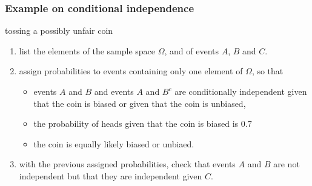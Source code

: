 \begin{frame}
    \frametitle{Example on conditional independence}

    \scriptsize
    \begin{manualProbExample}{tossing a possibly unfair coin}

        \begin{enumerate}[a]

            \item list the elements of the sample space $\Omega$, and of events $A$, $B$ and $C$.

            \item assign probabilities to events containing only one element of
                $\Omega$, so that 

                \begin{itemize}
                    \scriptsize

                    \item events $A$ and $B$  and events $A$ and $B^c$ are
                        conditionally independent given that the coin is biased
                        or given that the coin is unbiased,

                    \item the probability of heads given that the coin is
                        biased is 0.7

                    \item the coin is equally likely biased or unbiaed.

                \end{itemize}

            \item with the previous assigned probabilities, check that events
                $A$ and $B$ are not independent but that they are independent
                given $C$.

        \end{enumerate}

    \end{manualProbExample}
    \normalsize

\end{frame}

